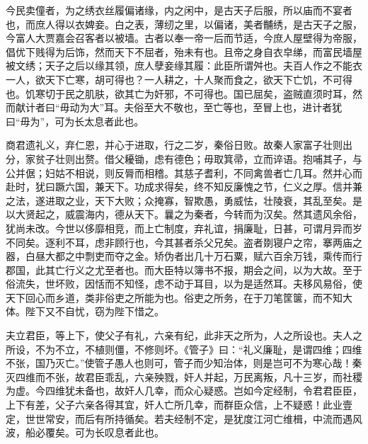 \documentclass[12pt,UTF8]{ctexbook}
\begin{document}
今民卖僮者，为之绣衣丝履偏诸缘，内之闲中，是古天子后服，所以庙而不宴者也，而庶人得以衣婢妾。白之表，薄纫之里，以偏诸，美者黼绣，是古天子之服，今富人大贾嘉会召客者以被墙。古者以奉一帝一后而节适，今庶人屋壁得为帝服，倡优下贱得为后饰，然而天下不屈者，殆未有也。且帝之身自衣皁绨，而富民墙屋被文绣；天子之后以缘其领，庶人孽妾缘其履：此臣所谓舛也。夫百人作之不能衣一人，欲天下亡寒，胡可得也？一人耕之，十人聚而食之，欲天下亡饥，不可得也。饥寒切于民之肌肤，欲其亡为奸邪，不可得也。国已屈矣，盗贼直须时耳，然而献计者曰“毋动为大”耳。夫俗至大不敬也，至亡等也，至冒上也，进计者犹曰“毋为”，可为长太息者此也。



商君遗礼义，弃仁恩，并心于进取，行之二岁，秦俗日败。故秦人家富子壮则出分，家贫子壮则出赘。借父耰锄，虑有德色；毋取箕帚，立而谇语。抱哺其子，与公并倨；妇姑不相说，则反脣而相稽。其慈子耆利，不同禽兽者亡几耳。然并心而赴时，犹曰蹶六国，兼天下。功成求得矣，终不知反廉愧之节，仁义之厚。信并兼之法，遂进取之业，天下大败；众掩寡，智欺愚，勇威怯，壮陵衰，其乱至矣。是以大贤起之，威震海内，德从天下。曩之为秦者，今转而为汉矣。然其遗风余俗，犹尚未改。今世以侈靡相竞，而上亡制度，弃礼谊，捐廉耻，日甚，可谓月异而岁不同矣。逐利不耳，虑非顾行也，今其甚者杀父兄矣。盗者剟寝户之帘，搴两庙之器，白昼大都之中剽吏而夺之金。矫伪者出几十万石粟，赋六百余万钱，乘传而行郡国，此其亡行义之尤至者也。而大臣特以簿书不报，期会之间，以为大故。至于俗流失，世坏败，因恬而不知怪，虑不动于耳目，以为是适然耳。夫移风易俗，使天下回心而乡道，类非俗吏之所能为也。俗吏之所务，在于刀笔筐箧，而不知大体。陛下又不自忧，窃为陛下惜之。



夫立君臣，等上下，使父子有礼，六亲有纪，此非天之所为，人之所设也。夫人之所设，不为不立，不植则僵，不修则坏。《管子》曰：“礼义廉耻，是谓四维；四维不张，国乃灭亡。”使管子愚人也则可，管子而少知治体，则是岂可不为寒心哉！秦灭四维而不张，故君臣乖乱，六亲殃戮，奸人并起，万民离叛，凡十三岁，而社稷为虚。今四维犹未备也，故奸人几幸，而众心疑惑。岂如今定经制，令君君臣臣，上下有差，父子六亲各得其宜，奸人亡所几幸，而群臣众信，上不疑惑！此业壹定，世世常安，而后有所持循矣。若夫经制不定，是犹度江河亡维楫，中流而遇风波，船必覆矣。可为长叹息者此也。
\end{document}
